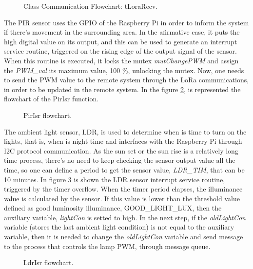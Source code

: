\begin{figure}[H]
	\caption{Class Communication Flowchart: tLoraRecv.}
	\label{fig:LStLoraRecv}
\end{figure}


The PIR sensor uses the GPIO of the Raspberry Pi in order to inform the system if there's movement in the surrounding area. In the afirmative case, it puts the high digital value on its output, and this can be used to generate an interrupt service routine, triggered on the rising edge of the output signal of the sensor. When this routine is executed, it locks the mutex \textit{mutChangePWM} and assign the \textit{PWM\_val} its maximum value, 100 \%, unlocking the mutex. Now, one needs to send the PWM value to the remote system through the LoRa communications, in order to be updated in the remote system. In the figure \ref{fig:pir_isr}, is represented the flowchart of the PirIsr function.

\begin{figure}[H]
	\centering
	\caption{PirIsr flowchart.}
	\label{fig:pir_isr}
\end{figure}

The ambient light sensor, LDR, is used to determine when is time to turn on the lights, that is, when is night time and interfaces with the Raspberry Pi through I2C protocol communication. As the sun set or the sun rise is a relatively long time process, there's no need to keep checking the sensor output value all the time, so one can define a period to get the sensor value, \textit{LDR\_TIM}, that can be 10 minutes. In figure \ref{fig:ldr_isr} is shown the LDR sensor interrupt service routine, triggered by the timer overflow. When the timer period elapses, the illuminance value is calculated by the sensor. If this value is lower than the threshold value defined as good luminosity illuminance, GOOD\_LIGHT\_LUX, then the auxiliary variable, \textit{lightCon} is setted to high. In the next step, if the \textit{oldLightCon} variable (stores the last ambient light condition) is not equal to the auxiliary variable, then it is needed to change the \textit{oldLightCon} variable and send message to the process that controls the lamp PWM, through message queue. 

\begin{figure}[H]
	\centering
	\caption{LdrIsr flowchart.}
	\label{fig:ldr_isr}
\end{figure}

